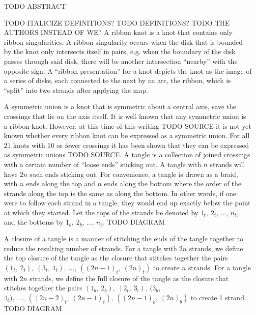 

\begin{paperabstract}
TODO ABSTRACT
\end{paperabstract}
\begin{paper}
\theorems
TODO ITALICIZE DEFINITIONS?
TODO DEFINITIONS?
TODO THE AUTHORS INSTEAD OF WE?
A ribbon knot is a knot that contains only ribbon singularities.
A ribbon singularity occurs when the disk that is bounded by the knot only
intersects itself in pairs, e.g. when the boundary of the disk passes through
said disk, there will be another intersection ``nearby'' with the opposite sign.
A ``ribbon presentation'' for a knot depicts the knot as the image of a series
of disks, each connected to the next by an arc, the ribbon, which is ``split''
into two strands after applying the map.

A symmetric union is a knot that is symmetric about a central axis, save the
crossings that lie on the axis itself.
It is well known that any symmetric union is a ribbon knot.
However, at this time of this writing TODO SOURCE it is not yet known whether
every ribbon knot can be expressed as a symmetric union.
For all 21 knots with 10 or fewer crossings it has been shown that they can be
expressed as symmetric unions TODO SOURCE.
A tangle is a collection of joined crossings with a certain number of ``loose
ends'' sticking out.
A tangle with $n$ strands will have $2n$ such ends sticking out.
For convenience, a tangle is drawn as a braid, with $n$ ends along the top and
$n$ ends along the bottom where the order of the strands along the top is the
same as along the bottom.
In other words, if one were to follow each strand in a tangle, they would end up
exactly below the point at which they started.
Let the tops of the strands be denoted by $1_t,~2_t$, ..., $n_t$, and the
bottoms  by $1_b,~2_b$, ..., $n_b$.
TODO DIAGRAM

A closure of a tangle is a manner of stitching the ends of the tangle together
to reduce the resulting number of strands.
For a tangle with $2n$ strands, we define the top closure of the tangle as the
closure that stitches together the pairs
$(1_t,~2_t),~(3_t,~4_t),~...,~((2n-1)_t,~(2n)_t)$ to create $n$ strands.
For a tangle with $2n$ strands, we define the full closure of the tangle as the
closure that stitches together the pairs $(1_b,~2_b),~(2_t,~3_t),~(3_b$,
$4_b),~...,~((2n-2)_t,~(2n-1)_t),~((2n-1)_b,~(2n)_b)$ to create 1 strand.
TODO DIAGRAM


\end{paper}

